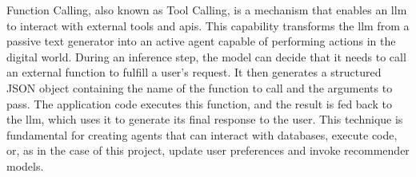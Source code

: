 Function Calling, also known as Tool Calling, is a mechanism that enables an \ac{llm} to interact with external tools and \acp{api}. This capability transforms the \ac{llm} from a passive text generator into an active agent capable of performing actions in the digital world. During an inference step, the model can decide that it needs to call an external function to fulfill a user's request. It then generates a structured JSON object containing the name of the function to call and the arguments to pass. The application code executes this function, and the result is fed back to the \ac{llm}, which uses it to generate its final response to the user. This technique is fundamental for creating agents that can interact with databases, execute code, or, as in the case of this project, update user preferences and invoke recommender models.